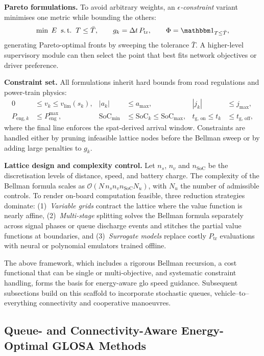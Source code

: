 \textbf{Pareto formulations.}
To avoid arbitrary weights, an \emph{$\epsilon$-constraint} variant minimises one metric while bounding the others:
\[
\min\;E \;\;\text{s.\,t.}\;\;T\le\bar T,\qquad
g_k=\Delta t\,P_{\text{tr}}, \qquad
\Phi= \mathbbm 1_{T\le \bar T},
\]
generating Pareto-optimal fronts by sweeping the tolerance $\bar T$. A higher-level supervisory module can then select the point that best fits network objectives or driver preference.

\textbf{Constraint set.}
All formulations inherit hard bounds from road regulations and power-train physics:
\begin{align*}
0 &\le v_k\le v_{\mathrm{lim}}(s_k), &
|a_k| &\le a_{\max}, &
|j_k| &\le j_{\max}, \nonumber\\
P_{\text{eng},k} &\le P_{\text{eng}}^{\max}, &
\mathrm{SoC}_{\min} &\le \mathrm{SoC}_k\le \mathrm{SoC}_{\max}, &
t_{\mathrm{g,\,on}}\le t_k &\le t_{\mathrm{g,\,off}},
\end{align*}
where the final line enforces the \ac{spat}-derived arrival window. Constraints are handled either by pruning infeasible lattice nodes before the Bellman sweep or by adding large penalties to $g_k$.

\textbf{Lattice design and complexity control.}
Let $n_s$, $n_v$ and $n_{\mathrm{SoC}}$ be the discretisation levels of distance, speed, and battery charge. The complexity of the Bellman formula scales as $\mathcal O(N\,n_s n_v n_{\mathrm{SoC}} N_u)$, with $N_u$ the number of admissible controls. To render on-board computation feasible, three reduction strategies dominate:  
(1)~\textit{Variable grids} contract the lattice where the value function is nearly affine,  
(2)~\textit{Multi-stage} splitting solves the Bellman formula separately across signal phases or queue discharge events and stitches the partial value functions at boundaries, and  
(3)~\textit{Surrogate models} replace costly $P_{\text{tr}}$ evaluations with neural or polynomial emulators trained offline.

The above framework, which includes a rigorous Bellman recursion, a cost functional that can be single or multi-objective, and systematic constraint handling, forms the basis for energy-aware \ac{glo} speed guidance. Subsequent subsections build on this scaffold to incorporate stochastic queues, vehicle–to–everything connectivity and cooperative manoeuvres.

\subsection{Queue- and Connectivity-Aware Energy-Optimal GLOSA Methods}
\label{subsec:eco_dp_queue}

